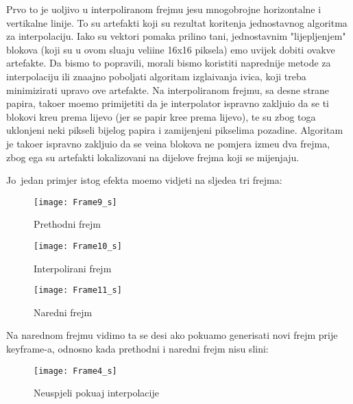 Prvo \sh to je uo\ch ljivo u interpoliranom frejmu jesu mnogobrojne horizontalne i vertikalne linije. To su artefakti koji su rezultat kori\sh tenja jednostavnog algoritma za interpolaciju. Iako su vektori
pomaka prili\ch no ta\ch ni, jednostavnim "lijepljenjem" blokova (koji su u ovom slu\ch aju veli\ch ine 16x16 piksela) \cj emo uvijek dobiti ovakve artefakte. Da bismo to popravili, morali bismo koristiti
naprednije metode za interpolaciju ili zna\ch ajno pobolj\sh ati algoritam izgla\dj ivanja ivica, koji treba minimizirati upravo ove artefakte. Na interpoliranom frejmu, sa desne strane papira, tako\dj er
mo\zh emo primijetiti da je interpolator ispravno zaklju\ch io da se ti blokovi kre\cj u prema lijevo (jer se papir kre\cj e prema lijevo), te su zbog toga uklonjeni neki pikseli bijelog papira i zamijenjeni
pikselima pozadine. Algoritam je tako\dj er ispravno zaklju\ch io da se ve\cj ina blokova ne pomjera izme\dj u dva frejma, zbog \ch ega su artefakti lokalizovani na dijelove frejma koji se mijenjaju.

Jo\sh\ jedan primjer istog efekta mo\zh emo vidjeti na sljede\cj a tri frejma:

\begin{figure}[H]
\caption{Prethodni frejm}
\texttt{[image: Frame9\_s]}
\centering
\end{figure}

\begin{figure}[H]
\caption{Interpolirani frejm}
\texttt{[image: Frame10\_s]}
\centering
\end{figure}

\begin{figure}[H]
\caption{Naredni frejm}
\texttt{[image: Frame11\_s]}
\centering
\end{figure}

Na narednom frejmu vidimo \sh ta se desi ako poku\sh amo generisati novi frejm prije keyframe-a, odnosno kada prethodni i naredni frejm nisu sli\ch ni:

\begin{figure}[H]
\caption{Neuspjeli poku\sh aj interpolacije}
\texttt{[image: Frame4\_s]}
\centering
\end{figure}